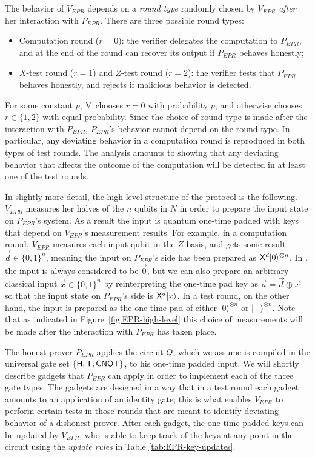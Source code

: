 \documentclass[11pt]{article}
\newcommand{\ket}[1]{|#1\rangle}
\newcommand{\ver}{\textsc{V}}
\begin{document}
The behavior of $V_{EPR}$ depends on a \emph{round type} randomly chosen by $V_{EPR}$ {\em after} her interaction with $P_{EPR}$. There are three possible round types:
\begin{itemize}[nolistsep]
\item Computation round ($r=0$): the verifier delegates the computation to $P_{EPR}$, and at the end of the round can recover its output if $P_{EPR}$ behaves honestly;
\item $X$-test round ($r=1$) and $Z$-test round ($r=2$): the verifier tests that  $P_{EPR}$  behaves honestly, and rejects if malicious behavior is detected.
\end{itemize}
For some constant $p$, $\ver$ chooses $r=0$ with probability $p$, and otherwise chooses $r\in\{1,2\}$ with equal probability. Since the choice of round type is made after the interaction with $P_{EPR}$, $P_{EPR}$'s behavior cannot depend on the round type. In particular, any deviating behavior in a computation round is reproduced in both types of test rounds. The analysis amounts to showing that any deviating behavior that affects the outcome of the computation will be detected in at least one of the test rounds. 

In slightly more detail, the high-level structure of the protocol is the following. $V_{EPR}$ measures her halves of the $n$ qubits in $N$ in order to prepare the input state on $P_{EPR}$'s system. As a result the input is quantum one-time padded with keys that depend on $V_{EPR}$'s measurement results. For example, in a computation round, $V_{EPR}$ measures each input qubit in the $Z$ basis, and gets some result $\vec{d}\in\{0,1\}^n$, meaning the input on $P_{EPR}$'s side has been prepared as ${\sf X}^{\vec{d}}\ket{0}^{\otimes n}$. In \cite{broadbent15howtoverify}, the input is always considered to be $\vec{0}$, but we can also prepare an arbitrary classical input $\vec{x}\in\{0,1\}^n$ by reinterpreting the one-time pad key as $\vec{a}=\vec{d}\oplus \vec{x}$ so that the input state on $P_{EPR}$'s side is ${\sf X}^{\vec{a}}\ket{\vec{x}}$. In a test round, on the other hand, the input is prepared as the one-time pad of either $\ket{0}^{\otimes n}$ or $\ket{+}^{\otimes n}$. Note that as indicated in Figure~\ref{fig:EPR-high-level} this choice of measurements will be made after the interaction with $P_{EPR}$ has taken place.

The honest prover $P_{EPR}$ applies the circuit $Q$, which we assume is compiled in the universal gate set $\{{\sf H},{\sf T},{\sf CNOT}\}$, to his one-time padded input. We will shortly describe gadgets that $P_{EPR}$ can apply in order to implement each of the three gate types. The gadgets are designed in a way that in a test round each gadget amounts to an application of an identity gate; this is what enables $V_{EPR}$ to perform certain tests in those rounds that are meant to identify deviating behavior of a dishonest prover. After each gadget, the one-time padded keys can be updated by $V_{EPR}$, who is able to keep track of the keys at any point in the circuit using the \emph{update rules} in Table \ref{tab:EPR-key-updates}. 
\end{document}

